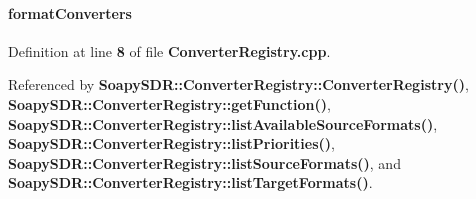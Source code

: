 \paragraph[{format\+Converters}]{ format\+Converters\hspace{0.3cm}{\ttfamily [static]}}\label{ConverterRegistry_8cpp_ade89ea2868fd59db9599347b1c1cb096}


Definition at line {\bf 8} of file {\bf Converter\+Registry.\+cpp}.



Referenced by {\bf Soapy\+S\+D\+R\+::\+Converter\+Registry\+::\+Converter\+Registry()}, {\bf Soapy\+S\+D\+R\+::\+Converter\+Registry\+::get\+Function()}, {\bf Soapy\+S\+D\+R\+::\+Converter\+Registry\+::list\+Available\+Source\+Formats()}, {\bf Soapy\+S\+D\+R\+::\+Converter\+Registry\+::list\+Priorities()}, {\bf Soapy\+S\+D\+R\+::\+Converter\+Registry\+::list\+Source\+Formats()}, and {\bf Soapy\+S\+D\+R\+::\+Converter\+Registry\+::list\+Target\+Formats()}.


